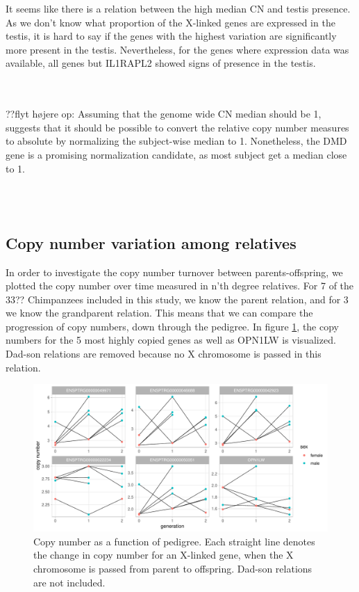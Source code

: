 \noindent It seems like there is a relation between the high median CN and testis presence. As we don't know what proportion of the X-linked genes are expressed in the testis, it is hard to say if the genes with the highest variation are significantly more present in the testis. Nevertheless, for the genes where expression data was available, all genes but IL1RAPL2 showed signs of presence in the testis.






\\
\\
\noindent ??flyt højere op: Assuming that the genome wide CN median should be 1, suggests that it should be possible to convert the relative copy number measures to absolute by normalizing the subject-wise median to 1. Nonetheless, the DMD gene is a promising normalization candidate, as most subject get a median close to 1.

\\
\\
\subsection*{Copy number variation among relatives}
In order to investigate the copy number turnover between parents-offspring, we plotted the copy number over time measured in n'th degree relatives. For 7 of the 33?? Chimpanzees included in this study, we know the parent relation, and for 3 we know the grandparent relation. This means that we can compare the progression of copy numbers, down through the pedigree. In figure \ref{fig:pedigree_CN}, the copy numbers for the 5 most highly copied genes as well as OPN1LW is visualized. Dad-son relations are removed because no X chromosome is passed in this relation.

\begin{figure}[h] 
  \centering
  \includegraphics[scale=0.78]{figures/fig_pedigree_CN_3.pdf}
  \caption{Copy number as a function of pedigree. Each straight line denotes the change in copy number for an X-linked gene, when the X chromosome is passed from parent to offspring. Dad-son relations are not included.}
  \label{fig:pedigree_CN}
\end{figure}



